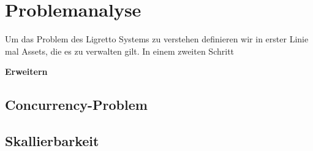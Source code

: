 \section{Problemanalyse}   %

Um das Problem des Ligretto Systems zu verstehen definieren wir in erster Linie mal Assets, die es zu verwalten gilt. In einem zweiten Schritt

\color{red}
\textbf{Erweitern}
\color{black}


\subsection{Concurrency-Problem}


\subsection{Skallierbarkeit}

